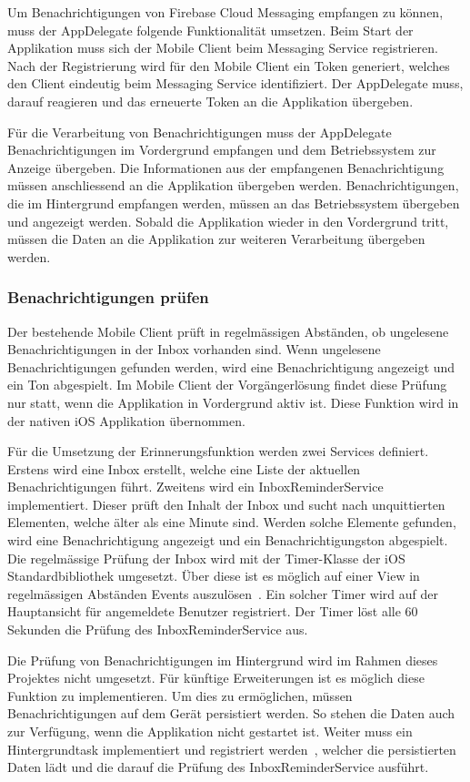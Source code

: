 Um Benachrichtigungen von Firebase Cloud Messaging empfangen zu können, muss der AppDelegate folgende Funktionalität umsetzen.
Beim Start der Applikation muss sich der Mobile Client beim Messaging Service registrieren.
Nach der Registrierung wird für den Mobile Client ein Token generiert, welches den Client eindeutig beim Messaging Service identifiziert.
Der AppDelegate muss, darauf reagieren und das erneuerte Token an die Applikation übergeben.

Für die Verarbeitung von Benachrichtigungen muss der AppDelegate Benachrichtigungen im Vordergrund empfangen und dem Betriebssystem zur Anzeige übergeben.
Die Informationen aus der empfangenen Benachrichtigung müssen anschliessend an die Applikation übergeben werden.
Benachrichtigungen, die im Hintergrund empfangen werden, müssen an das Betriebssystem übergeben und angezeigt werden.
Sobald die Applikation wieder in den Vordergrund tritt, müssen die Daten an die Applikation zur weiteren Verarbeitung übergeben werden.

\subsubsection{Benachrichtigungen prüfen}

Der bestehende Mobile Client prüft in regelmässigen Abständen, ob ungelesene Benachrichtigungen in der Inbox vorhanden sind.
Wenn ungelesene Benachrichtigungen gefunden werden, wird eine Benachrichtigung angezeigt und ein Ton abgespielt.
Im Mobile Client der Vorgängerlösung findet diese Prüfung nur statt, wenn die Applikation in Vordergrund aktiv ist.
Diese Funktion wird in der nativen iOS Applikation übernommen.

Für die Umsetzung der Erinnerungsfunktion werden zwei Services definiert.
Erstens wird eine Inbox erstellt, welche eine Liste der aktuellen Benachrichtigungen führt.
Zweitens wird ein InboxReminderService implementiert.
Dieser prüft den Inhalt der Inbox und sucht nach unquittierten Elementen, welche älter als eine Minute sind.
Werden solche Elemente gefunden, wird eine Benachrichtigung angezeigt und ein Benachrichtigungston abgespielt.
Die regelmässige Prüfung der Inbox wird mit der Timer-Klasse der iOS Standardbibliothek umgesetzt.
Über diese ist es möglich auf einer View in regelmässigen Abständen Events auszulösen~\cite{ios_timer}.
Ein solcher Timer wird auf der Hauptansicht für angemeldete Benutzer registriert.
Der Timer löst alle 60 Sekunden die Prüfung des InboxReminderService aus.

Die Prüfung von Benachrichtigungen im Hintergrund wird im Rahmen dieses Projektes nicht umgesetzt.
Für künftige Erweiterungen ist es möglich diese Funktion zu implementieren.
Um dies zu ermöglichen, müssen Benachrichtigungen auf dem Gerät persistiert werden.
So stehen die Daten auch zur Verfügung, wenn die Applikation nicht gestartet ist.
Weiter muss ein Hintergrundtask implementiert und registriert werden~\cite{ios_bgtaskscheduler}, welcher die persistierten Daten lädt und die darauf die Prüfung des InboxReminderService ausführt.

